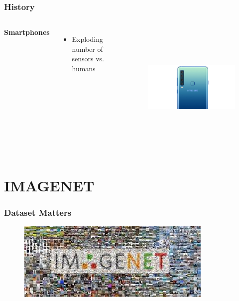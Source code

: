 \documentclass{beamer}
\begin{document}
\begin{frame}
\frametitle{History}
\begin{columns}[c] %

\textbf{Smartphones}
\begin{itemize}
\item Exploding number of sensors vs. humans

\end{itemize}

\begin{figure}
	\includegraphics[height=180pt]{Pics/samsung.jpg}
\end{figure}
\end{columns}
\end{frame}

\section{IMAGENET}
\begin{frame}
	\frametitle{Dataset Matters}
	\begin{figure}
		\includegraphics[width=\linewidth]{Pics/image_net.jpeg}
	\end{figure}
\end{frame}
\end{document}
